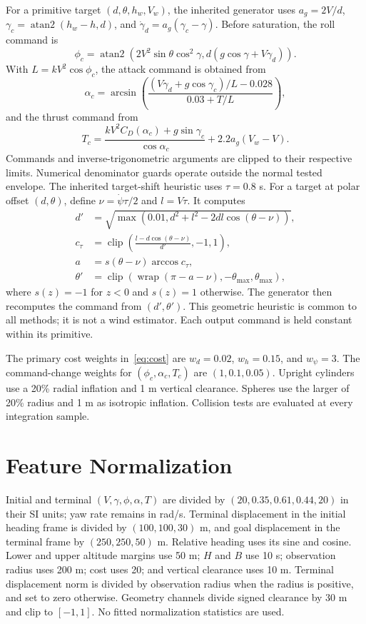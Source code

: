 \documentclass[journal]{IEEEtran}
\newcommand{\wrap}{\operatorname{wrap}}
\newcommand{\clip}{\operatorname{clip}}
\begin{document}
For a primitive target $(d,\theta,h_w,V_w)$, the inherited generator uses $a_g=2V/d$, $\gamma_c=\operatorname{atan2}(h_w-h,d)$, and $\dot\gamma_d=a_g(\gamma_c-\gamma)$. Before saturation, the roll command is
\begin{equation}
 \phi_c=\operatorname{atan2}\!\left(2V^2\sin\theta\cos^2\gamma,
 d(g\cos\gamma+V\dot\gamma_d)\right).
\end{equation}
With $L=kV^2\cos\phi_c$, the attack command is obtained from
\begin{equation}
 \alpha_c=\arcsin\!\left(
 \frac{(V\dot\gamma_d+g\cos\gamma_c)/L-0.028}{0.03+T/L}\right),
\end{equation}
and the thrust command from
\begin{equation}
 T_c=\frac{kV^2C_D(\alpha_c)+g\sin\gamma_c}{\cos\alpha_c}
       +2.2a_g(V_w-V).
\end{equation}
Commands and inverse-trigonometric arguments are clipped to their respective limits. Numerical denominator guards operate outside the normal tested envelope. The inherited target-shift heuristic uses $\tau=0.8$ s. For a target at polar offset $(d,\theta)$, define $\nu=\dot\psi\tau/2$ and $l=V\tau$. It computes
\begin{align}
 d'&=\sqrt{\max(0.01,d^2+l^2-2dl\cos(\theta-\nu))},\\
 c_\tau&=\clip\!\left(\frac{l-d\cos(\theta-\nu)}{d'},-1,1\right),\nonumber\\
 a&=s(\theta-\nu)\arccos c_\tau,\\
 \theta'&=\clip(\wrap(\pi-a-\nu),-\theta_{\max},\theta_{\max}),
\end{align}
where $s(z)=-1$ for $z<0$ and $s(z)=1$ otherwise. The generator then recomputes the command from $(d',\theta')$. This geometric heuristic is common to all methods; it is not a wind estimator. Each output command is held constant within its primitive.

The primary cost weights in~\eqref{eq:cost} are $w_d=0.02$, $w_h=0.15$, and $w_\psi=3$. The command-change weights for $(\phi_c,\alpha_c,T_c)$ are $(1,0.1,0.05)$. Upright cylinders use a 20\% radial inflation and 1 m vertical clearance. Spheres use the larger of 20\% radius and 1 m as isotropic inflation. Collision tests are evaluated at every integration sample.
\section{Feature Normalization}\label{app:features}
Initial and terminal $(V,\gamma,\phi,\alpha,T)$ are divided by $(20,0.35,0.61,0.44,20)$ in their SI units; yaw rate remains in rad/s. Terminal displacement in the initial heading frame is divided by $(100,100,30)$ m, and goal displacement in the terminal frame by $(250,250,50)$ m. Relative heading uses its sine and cosine. Lower and upper altitude margins use 50 m; $H$ and $B$ use 10 s; observation radius uses 200 m; cost uses 20; and vertical clearance uses 10 m. Terminal displacement norm is divided by observation radius when the radius is positive, and set to zero otherwise. Geometry channels divide signed clearance by 30 m and clip to $[-1,1]$. No fitted normalization statistics are used.
\end{document}
